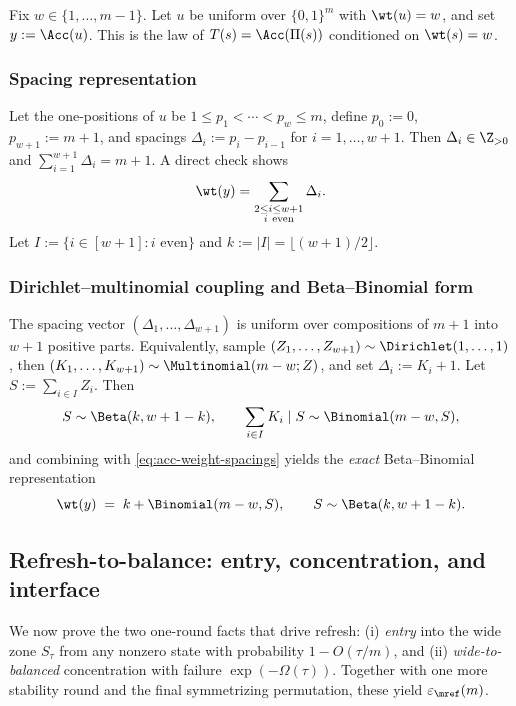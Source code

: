 Fix \(w\in\{1,\dots,m-1\}\). Let \(u\) be uniform over \(\{0,1\}^m\) with \(\wt(u)=w\), and set \(y:=\Acc(u)\).
This is the law of \(T(s)=\Acc(\Pi(s))\) conditioned on \(\wt(s)=w\).

\subsubsection*{Spacing representation}

Let the one-positions of \(u\) be \(1\le p_1<\cdots<p_w\le m\), define \(p_0:=0\), \(p_{w+1}:=m+1\),
and spacings \(\Delta_i:=p_i-p_{i-1}\) for \(i=1,\dots,w+1\).
Then \(\Delta_i\in\Z_{>0}\) and \(\sum_{i=1}^{w+1}\Delta_i=m+1\).
A direct check shows
\begin{equation}
\label{eq:acc-weight-spacings}
\wt(y)=\sum_{\substack{2\le i\le w+1\\ i\ \mathrm{even}}}\Delta_i.
\end{equation}
Let \(I:=\{i\in[w+1]: i \text{ even}\}\) and \(k:=|I|=\lfloor(w+1)/2\rfloor\).

\subsubsection*{Dirichlet--multinomial coupling and Beta--Binomial form}

The spacing vector \((\Delta_1,\dots,\Delta_{w+1})\) is uniform over compositions of \(m+1\) into \(w+1\) positive parts.
Equivalently, sample \((Z_1,\dots,Z_{w+1})\sim\Dirichlet(1,\dots,1)\), then
\((K_1,\dots,K_{w+1})\sim\Multinomial(m-w;Z)\), and set \(\Delta_i:=K_i+1\).
Let \(S:=\sum_{i\in I}Z_i\). Then
\[
S\sim\Beta(k,w+1-k),
\qquad
\sum_{i\in I}K_i \mid S \sim \Binomial(m-w,S),
\]
and combining with \eqref{eq:acc-weight-spacings} yields the \emph{exact} Beta--Binomial representation
\begin{equation}
\label{eq:acc-weight-betabinom}
\wt(y) \;=\; k + \Binomial(m-w,S),
\qquad S\sim\Beta(k,w+1-k).
\end{equation}

\subsection{Refresh-to-balance: entry, concentration, and interface}
\label{sec:refresh-to-balance}

We now prove the two one-round facts that drive refresh:
(i) \emph{entry} into the wide zone \(S_\tau\) from any nonzero state with probability \(1-O(\tau/m)\), and
(ii) \emph{wide-to-balanced} concentration with failure \(\exp(-\Omega(\tau))\).
Together with one more stability round and the final symmetrizing permutation, these yield \(\varepsilon_{\mref}(m)\).

